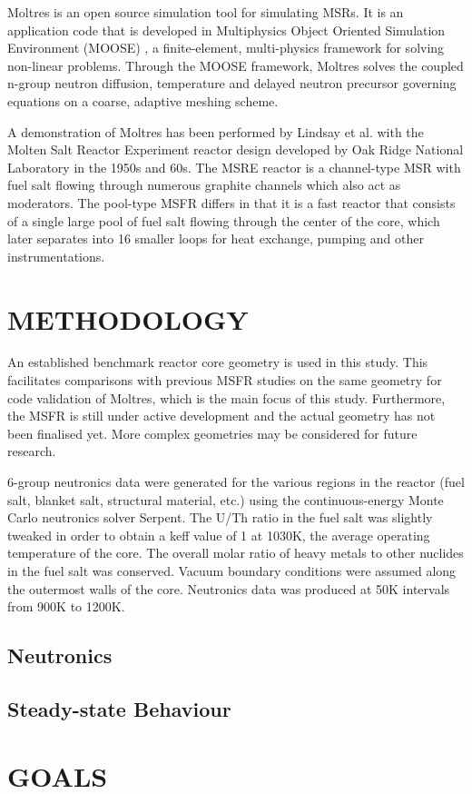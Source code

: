 \documentclass[letterpaper]{mandc2019}
\begin{document}
Moltres is an open source simulation tool for simulating MSRs. It is an application code that is developed in Multiphysics Object Oriented Simulation Environment (MOOSE) \cite{gaston_moose:_2009}, a finite-element, multi-physics framework for solving non-linear problems. Through the MOOSE framework, Moltres solves the coupled n-group neutron diffusion, temperature and delayed neutron precursor governing equations on a coarse, adaptive meshing scheme.



A demonstration of Moltres has been performed by Lindsay et al. \cite{lindsay_introduction_2018} with the Molten Salt Reactor Experiment reactor design developed by Oak Ridge National Laboratory in the 1950s and 60s. The MSRE reactor is a channel-type MSR with fuel salt flowing through numerous graphite channels which also act as moderators. The pool-type MSFR differs in that it is a fast reactor that consists of a single large pool of fuel salt flowing through the center of the core, which later separates into 16 smaller loops for heat exchange, pumping and other instrumentations. 

\section{METHODOLOGY}

An established benchmark reactor core geometry is used in this study. This facilitates comparisons with previous MSFR studies on the same geometry for code validation of Moltres, which is the main focus of this study. Furthermore, the MSFR is still under active development and the actual geometry has not been finalised yet. More complex geometries may be considered for future research.

6-group neutronics data were generated for the various regions in the reactor (fuel salt, blanket salt, structural material, etc.) using the continuous-energy Monte Carlo neutronics solver Serpent. The U/Th ratio in the fuel salt was slightly tweaked in order to obtain a keff value of 1 at 1030K, the average operating temperature of the core. The overall molar ratio of heavy metals to other nuclides in the fuel salt was conserved. Vacuum boundary conditions were assumed along the outermost walls of the core. Neutronics data was produced at 50K intervals from 900K to 1200K.

\subsection{Neutronics}

\subsection{Steady-state Behaviour}

\section{GOALS}

\setlength{\baselineskip}{12pt}


\end{document}

